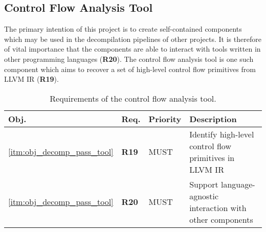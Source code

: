
\subsection{Control Flow Analysis Tool}
\label{sec:req_control_flow_analysis_tool}

The primary intention of this project is to create self-contained components which may be used in the decompilation pipelines of other projects. It is therefore of vital importance that the components are able to interact with tools written in other programming languages (\textbf{R20}). The control flow analysis tool is one such component which aims to recover a set of high-level control flow primitives from LLVM IR (\textbf{R19}).

\begin{table}[htbp]
	\begin{center}
		\begin{tabular}{|l|l|l|l|}
			\hline
			Obj. & Req. & Priority & Description \\
			\hline
			\ref{itm:obj_decomp_pass_tool} & \textbf{R19} & MUST & Identify high-level control flow primitives in LLVM IR \\
			\ref{itm:obj_decomp_pass_tool} & \textbf{R20} & MUST & Support language-agnostic interaction with other components \\
			\hline
		\end{tabular}
	\end{center}
	\caption{Requirements of the control flow analysis tool.}
\end{table}
